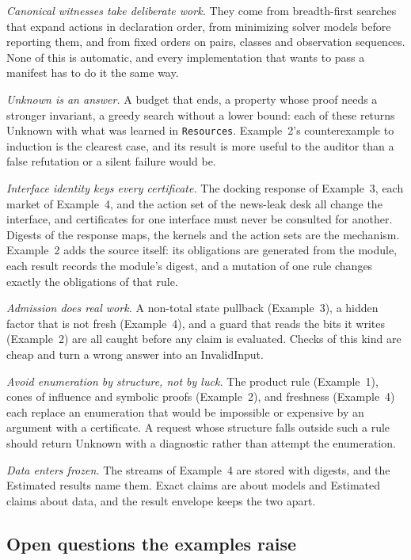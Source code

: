 \documentclass[11pt]{article}
\newcommand{\code}[1]{\texttt{#1}}
\theoremstyle{definition}
\theoremstyle{plain}
\begin{document}
\emph{Canonical witnesses take deliberate work.} They come from breadth-first searches that expand
actions in declaration order, from minimizing solver models before reporting them, and from fixed
orders on pairs, classes and observation sequences. None of this is automatic, and every implementation
that wants to pass a manifest has to do it the same way.

\emph{Unknown is an answer.} A budget that ends, a property whose proof needs a stronger invariant, a
greedy search without a lower bound: each of these returns Unknown with what was learned in
\code{Resources}. Example~2's counterexample to induction is the clearest case, and its result is more
useful to the auditor than a false refutation or a silent failure would be.

\emph{Interface identity keys every certificate.} The docking response of Example~3, each market of
Example~4, and the action set of the news-leak desk all change the interface, and certificates for one
interface must never be consulted for another. Digests of the response maps, the kernels and the action
sets are the mechanism. Example~2 adds the source itself: its obligations are generated from the
module, each result records the module's digest, and a mutation of one rule changes exactly the
obligations of that rule.

\emph{Admission does real work.} A non-total state pullback (Example~3), a hidden factor that is not
fresh (Example~4), and a guard that reads the bits it writes (Example~2) are all caught before any claim
is evaluated. Checks of this kind are cheap and turn a wrong answer into an InvalidInput.

\emph{Avoid enumeration by structure, not by luck.} The product rule (Example~1), cones of influence and
symbolic proofs (Example~2), and freshness (Example~4) each replace an enumeration that would be
impossible or expensive by an argument with a certificate. A request whose structure falls outside such a
rule should return Unknown with a diagnostic rather than attempt the enumeration.

\emph{Data enters frozen.} The streams of Example~4 are stored with digests, and the Estimated results
name them. Exact claims are about models and Estimated claims about data, and the result envelope keeps
the two apart.

\subsection{Open questions the examples raise}
\end{document}

